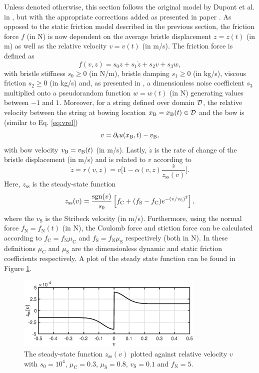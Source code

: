 Unless denoted otherwise, this section follows the original model by Dupont et al. in \cite{Dupont2002}, but with the appropriate corrections added as presented in paper \citeP[C]. As opposed to the static friction model described in the previous section, the friction force $f$ (in N) is now dependent on the average bristle displacement $z = z(t)$ (in m) as well as the relative velocity $v = v(t)$ (in m/s). The friction force is defined as
\begin{equation}\label{eq:elastoPlasticForce}
    f(v, z) = s_0z + s_1\dot z + s_2v + s_3w,
\end{equation}
with bristle stiffness $s_0 \geq 0$ (in N/m), bristle damping $s_1 \geq 0$ (in kg/s), viscous friction $s_2 \geq 0$ (in kg/s) and, as presented in \cite{Serafin2004}, a dimensionless noise coefficient $s_3$ multiplied onto a pseudorandom function $w = w(t)$ (in N) generating values between $-1$ and $1$. Moreover, for a string defined over domain $\mathcal{D}$, the relative velocity between the string at bowing location $x_{\text{B}} = x_{\text{B}}(t) \in \mathcal{D}$ and the bow is (similar to Eq. \eqref{eq:vrel})
\begin{equation}\label{eq:vrelElasto}
    v = \partial_t u(x_{\text{B}},t) - v_{\text{B}},
\end{equation}
with bow velocity $v_{\text{B}} = v_{\text{B}}(t)$ (in m/s). Lastly, $\dot z$ is the rate of change of the bristle displacement (in m/s) and is related to $v$ according to
\begin{equation}\label{eq:zdot}
    \dot z = r(v, z) = v \bigg[ 1-  \alpha(v, z)\frac{z}{z_\text{ss}(v)}\bigg].
\end{equation}
Here, $z_\text{ss}$ is the steady-state function
\begin{equation}\label{eq:zss}
    z_\text{ss}(v) = \frac{\text{sgn}(v)}{s_0}\left[f_\text{C}+(f_\text{S}-f_\text{C})e^{-(v/v_\text{S})^2}\right],
\end{equation}
where the $v_\text{S}$ is the Stribeck velocity (in m/s). Furthermore, using the normal force $f_\text{N} = f_\text{N}(t)$ (in N), the Coulomb force and stiction force can be calculated according to $f_\text{C} = f_\text{N}\mu_\text{C}$ and $f_\text{S} = f_\text{N}\mu_\text{S}$ respectively (both in N). In these definitions $\mu_\text{C}$ and $\mu_\text{S}$ are the dimensionless dynamic and static friction coefficients respectively. A plot of the steady state function can be found in Figure \ref{fig:zss}.

\begin{figure}[ht]
    \centering
    \includegraphics[width=0.8\textwidth]{figures/exciters/steadyState.eps}
    \caption{\label{fig:zss}The steady-state function $z_\text{ss}(v)$ plotted against relative velocity $v$ with $s_0 = 10^4$, $\mu_\text{C} = 0.3$, $\mu_\text{S} = 0.8$, $v_\text{S} = 0.1$ and $f_\text{N} = 5$.}
\end{figure}

